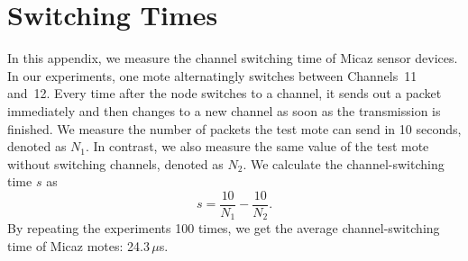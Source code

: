 


\appendix
\section{Switching Times}

In this appendix, we measure the channel switching time of Micaz
\cite{CROSSBOW} sensor devices.  In our experiments, one mote
alternatingly switches between Channels~11 and~12. Every time after
the node switches to a channel, it sends out a packet immediately and
then changes to a new channel as soon as the transmission is finished.
We measure the number of packets the test mote can send in 10 seconds,
denoted as $N_{1}$. In contrast, we also measure the same value of the
test mote without switching channels, denoted as $N_{2}$. We calculate
the channel-switching time $s$ as
\begin{displaymath}%
s=\frac{10}{N_{1}}-\frac{10}{N_{2}}.
\end{displaymath}%
By repeating the experiments 100 times, we get the average
channel-switching time of Micaz motes: 24.3\,$\mu$s.
